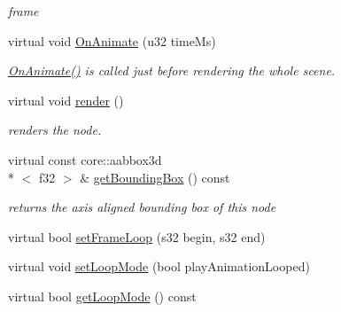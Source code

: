 \begin{DoxyCompactItemize}
\begin{DoxyCompactList}\small\item\em frame \end{DoxyCompactList}\item 
\hypertarget{classirr_1_1scene_1_1_c_animated_mesh_scene_node_aefe19f4f65db6280d21991c37d642c70}{virtual void \hyperlink{classirr_1_1scene_1_1_c_animated_mesh_scene_node_aefe19f4f65db6280d21991c37d642c70}{On\-Animate} (u32 time\-Ms)}\label{classirr_1_1scene_1_1_c_animated_mesh_scene_node_aefe19f4f65db6280d21991c37d642c70}

\begin{DoxyCompactList}\small\item\em \hyperlink{classirr_1_1scene_1_1_c_animated_mesh_scene_node_aefe19f4f65db6280d21991c37d642c70}{On\-Animate()} is called just before rendering the whole scene. \end{DoxyCompactList}\item 
\hypertarget{classirr_1_1scene_1_1_c_animated_mesh_scene_node_a4d98365d165893778d83abf45ee052a7}{virtual void \hyperlink{classirr_1_1scene_1_1_c_animated_mesh_scene_node_a4d98365d165893778d83abf45ee052a7}{render} ()}\label{classirr_1_1scene_1_1_c_animated_mesh_scene_node_a4d98365d165893778d83abf45ee052a7}

\begin{DoxyCompactList}\small\item\em renders the node. \end{DoxyCompactList}\item 
\hypertarget{classirr_1_1scene_1_1_c_animated_mesh_scene_node_a0cb1bce0ff3e6edca7bd34ce7dd3026a}{virtual const core\-::aabbox3d\\*
$<$ f32 $>$ \& \hyperlink{classirr_1_1scene_1_1_c_animated_mesh_scene_node_a0cb1bce0ff3e6edca7bd34ce7dd3026a}{get\-Bounding\-Box} () const }\label{classirr_1_1scene_1_1_c_animated_mesh_scene_node_a0cb1bce0ff3e6edca7bd34ce7dd3026a}

\begin{DoxyCompactList}\small\item\em returns the axis aligned bounding box of this node \end{DoxyCompactList}\item 
virtual bool \hyperlink{classirr_1_1scene_1_1_c_animated_mesh_scene_node_aa8afed5106c72abdd88fb698148f216a}{set\-Frame\-Loop} (s32 begin, s32 end)
\item 
virtual void \hyperlink{classirr_1_1scene_1_1_c_animated_mesh_scene_node_a44f24131bca39e70bd84d15f8b2f880b}{set\-Loop\-Mode} (bool play\-Animation\-Looped)
\item 
\hypertarget{classirr_1_1scene_1_1_c_animated_mesh_scene_node_ac2e44a08020b63ba0c33e745135b0f9c}{virtual bool \hyperlink{classirr_1_1scene_1_1_c_animated_mesh_scene_node_ac2e44a08020b63ba0c33e745135b0f9c}{get\-Loop\-Mode} () const }\label{classirr_1_1scene_1_1_c_animated_mesh_scene_node_ac2e44a08020b63ba0c33e745135b0f9c}


\end{DoxyCompactItemize}
